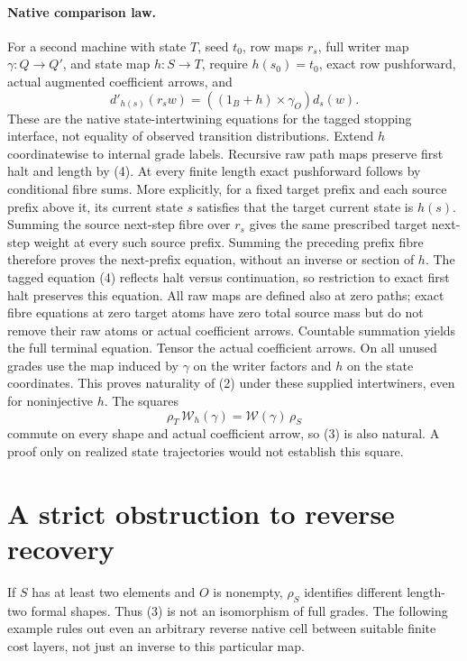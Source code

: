 \documentclass[11pt]{article}
\begin{document}
\paragraph{Native comparison law.}
For a second machine with state $T$, seed $t_0$, row maps $r_s$, full writer map $\gamma:Q\to Q'$, and state map $h:S\to T$, require $h(s_0)=t_0$, exact row pushforward, actual augmented coefficient arrows, and
\[
 d'_{h(s)}(r_s w)=((1_B+h)\times\gamma_O)d_s(w).           \tag{4}
\]
These are the native state-intertwining equations for the tagged stopping interface, not equality of observed transition distributions. Extend $h$ coordinatewise to internal grade labels. Recursive raw path maps preserve first halt and length by (4). At every finite length exact pushforward follows by conditional fibre sums. More explicitly, for a fixed target prefix and each source prefix above it, its current state $s$ satisfies that the target current state is $h(s)$. Summing the source next-step fibre over $r_s$ gives the same prescribed target next-step weight at every such source prefix. Summing the preceding prefix fibre therefore proves the next-prefix equation, without an inverse or section of $h$. The tagged equation (4) reflects halt versus continuation, so restriction to exact first halt preserves this equation. All raw maps are defined also at zero paths; exact fibre equations at zero target atoms have zero total source mass but do not remove their raw atoms or actual coefficient arrows. Countable summation yields the full terminal equation. Tensor the actual coefficient arrows. On all unused grades use the map induced by $\gamma$ on the writer factors and $h$ on the state coordinates. This proves naturality of (2) under these supplied intertwiners, even for noninjective $h$. The squares
\[
 \rho_T\,\mathcal W_h(\gamma)=\mathcal W(\gamma)\,\rho_S
\]
commute on every shape and actual coefficient arrow, so (3) is also natural. A proof only on realized state trajectories would not establish this square.

\section{A strict obstruction to reverse recovery}
If $S$ has at least two elements and $O$ is nonempty, $\rho_S$ identifies different length-two formal shapes. Thus (3) is not an isomorphism of full grades. The following example rules out even an arbitrary reverse native cell between suitable finite cost layers, not just an inverse to this particular map.
\end{document}
